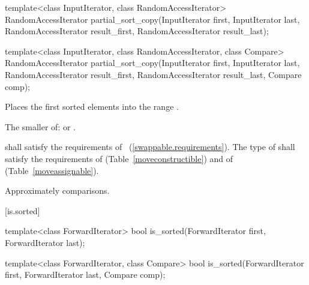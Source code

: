 %
\begin{itemdecl}
template<class InputIterator, class RandomAccessIterator>
  RandomAccessIterator
    partial_sort_copy(InputIterator first, InputIterator last,
                      RandomAccessIterator result_first,
                      RandomAccessIterator result_last);

template<class InputIterator, class RandomAccessIterator,
         class Compare>
  RandomAccessIterator
    partial_sort_copy(InputIterator first, InputIterator last,
                      RandomAccessIterator result_first,
                      RandomAccessIterator result_last,
                      Compare comp);
\end{itemdecl}

\begin{itemdescr}
\pnum
\effects
Places the first
sorted elements into the range
.

\pnum
\returns
The smaller of:
 or
.

\pnum
\requires
{} shall satisfy the requirements of
~(\ref{swappable.requirements}). The type
of  shall satisfy the requirements of
 (Table~\ref{moveconstructible}) and of
 (Table~\ref{moveassignable}).


\pnum
\complexity
Approximately
comparisons.
\end{itemdescr}

[is.sorted]{}

%
\begin{itemdecl}
template<class ForwardIterator>
  bool is_sorted(ForwardIterator first, ForwardIterator last);
\end{itemdecl}


\begin{itemdescr}
\pnum
\returns {}
\end{itemdescr}

%
\begin{itemdecl}
template<class ForwardIterator, class Compare>
  bool is_sorted(ForwardIterator first, ForwardIterator last,
    Compare comp);
\end{itemdecl}


